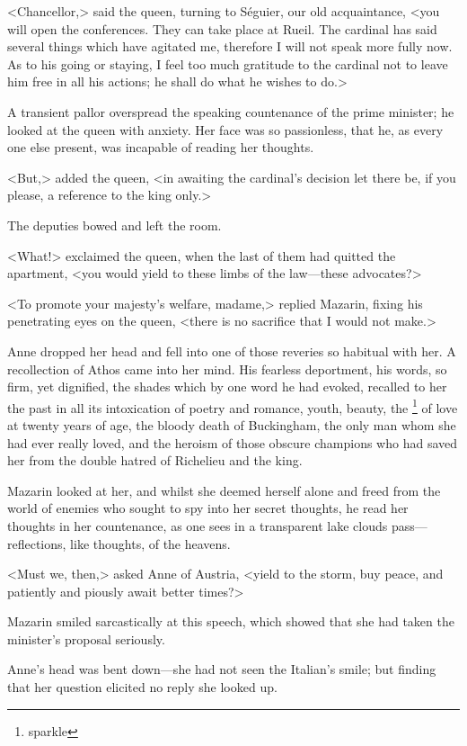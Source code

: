 <Chancellor,> said the queen, turning to Séguier, our old acquaintance, <you will open the conferences. They can take place at Rueil. The cardinal has said several things which have agitated me, therefore I will not speak more fully now. As to his going or staying, I feel too much gratitude to the cardinal not to leave him free in all his actions; he shall do what he wishes to do.>

A transient pallor overspread the speaking countenance of the prime minister; he looked at the queen with anxiety. Her face was so passionless, that he, as every one else present, was incapable of reading her thoughts.

<But,> added the queen, <in awaiting the cardinal's decision let there be, if you please, a reference to the king only.>

The deputies bowed and left the room.

<What!> exclaimed the queen, when the last of them had quitted the apartment, <you would yield to these limbs of the law—these advocates?>

<To promote your majesty's welfare, madame,> replied Mazarin, fixing his penetrating eyes on the queen, <there is no sacrifice that I would not make.>

Anne dropped her head and fell into one of those reveries so habitual with her. A recollection of Athos came into her mind. His fearless deportment, his words, so firm, yet dignified, the shades which by one word he had evoked, recalled to her the past in all its intoxication of poetry and romance, youth, beauty, the \footnote{sparkle} of love at twenty years of age, the bloody death of Buckingham, the only man whom she had ever really loved, and the heroism of those obscure champions who had saved her from the double hatred of Richelieu and the king.

Mazarin looked at her, and whilst she deemed herself alone and freed from the world of enemies who sought to spy into her secret thoughts, he read her thoughts in her countenance, as one sees in a transparent lake clouds pass—reflections, like thoughts, of the heavens.

<Must we, then,> asked Anne of Austria, <yield to the storm, buy peace, and patiently and piously await better times?>

Mazarin smiled sarcastically at this speech, which showed that she had taken the minister's proposal seriously.

Anne's head was bent down—she had not seen the Italian's smile; but finding that her question elicited no reply she looked up.

